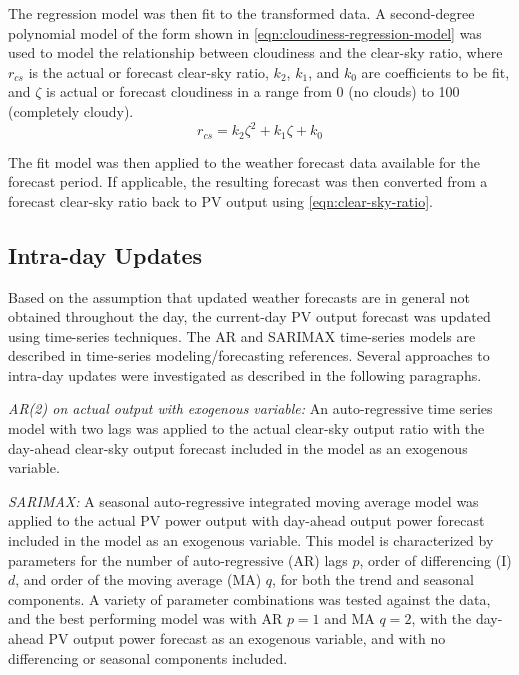 The regression model was then fit to the transformed data.
A second-degree polynomial model of the form shown in \cref{eqn:cloudiness-regression-model} was used to model the relationship between cloudiness and the clear-sky ratio, where
$r_{cs}$ is the actual or forecast clear-sky ratio,
$k_2$, $k_1$, and $k_0$ are coefficients to be fit, and
$\zeta$ is actual or forecast cloudiness in a range from 0 (no clouds) to 100 (completely cloudy).
%
\begin{equation}
	\label{eqn:cloudiness-regression-model}
	r_{cs} = k_2 \zeta^2 + k_1 \zeta + k_0
\end{equation}

The fit model was then applied to the weather forecast data available for the forecast period.
If applicable, the resulting forecast was then converted from a forecast clear-sky ratio back to PV output using \cref{eqn:clear-sky-ratio}.

\subsection{Intra-day Updates}
\label{sec:method-intraday}

Based on the assumption that updated weather forecasts are in general not obtained throughout the day, the current-day PV output forecast was updated using time-series techniques.
The AR and SARIMAX time-series models are described in time-series modeling/forecasting references\cite{box2015time,korstanje2021}.
Several approaches to intra-day updates were investigated as described in the following paragraphs.

\textit{AR(2) on actual output with exogenous variable:}
An auto-regressive time series model with two lags was applied to the actual clear-sky output ratio with the day-ahead clear-sky output forecast included in the model as an exogenous variable.

\textit{SARIMAX:}
A seasonal auto-regressive integrated moving average model was applied to the actual PV power output with day-ahead output power forecast included in the model as an exogenous variable.
This model is characterized by parameters for the number of auto-regressive (AR) lags $p$, order of differencing (I) $d$, and order of the moving average (MA) $q$, for both the trend and seasonal components.
A variety of parameter combinations was tested against the data, and the best performing model was with AR $p=1$ and MA $q=2$, with the day-ahead PV output power forecast as an exogenous variable, and with no differencing or seasonal components included.

